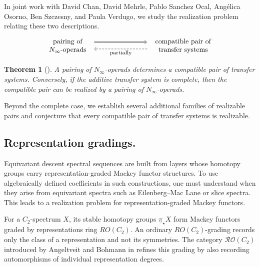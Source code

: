 \documentclass[11pt]{article}
\newtheorem{theorem}{Theorem}
\begin{document}
In joint work with David Chan, David Mehrle, Pablo Sanchez Ocal, Ang\'elica Osorno, Ben Szczesny, and Paula Verdugo, we study the realization problem relating these two descriptions.
\[
\begin{tikzcd}[column sep=8em]
\begin{array}{c}
\text{pairing of}\\
N_\infty\text{-operads}
\end{array}
\arrow[r, Rightarrow, shift left=1.3ex, shorten <=2pt, shorten >=2pt]
&
\begin{array}{c}
\text{compatible pair of}\\
\text{transfer systems}
\end{array}
\arrow[l, dashed, shift left=1ex,
       shorten <=2pt, shorten >=2pt,
       "\text{\footnotesize partially}"]
\end{tikzcd}
\]
\begin{theorem}[\cite{CCM+}]
A pairing of $N_\infty$-operads determines a compatible pair of
transfer systems.  Conversely, if the additive transfer system is
complete, then the compatible pair can be realized by a pairing of
$N_\infty$-operads.
\end{theorem}
Beyond the complete case, we establish several additional families of realizable pairs and conjecture that every compatible pair of transfer systems is realizable.

\subsection{Representation gradings.}
Equivariant descent spectral sequences are built from layers whose homotopy groups carry representation-graded Mackey functor structures. 
To use algebraically defined coefficients in such constructions, one must understand when they arise from equivariant spectra such as Eilenberg--Mac Lane or slice spectra.
This leads to a realization problem for representation-graded Mackey functors.

For a $C_2$-spectrum $X$, its stable homotopy groups $\underline{\pi}_\star X$ form Mackey functors graded by representations ring $RO(C_2)$.
An ordinary $RO(C_2)$-grading records only the class of a representation and not its symmetries.
The category $\mathcal{RO}(C_2)$ introduced by Angeltveit and Bohmann in \cite{AngeltveitBohmann} refines this grading by also recording automorphisms of individual representation degrees.
\end{document}
